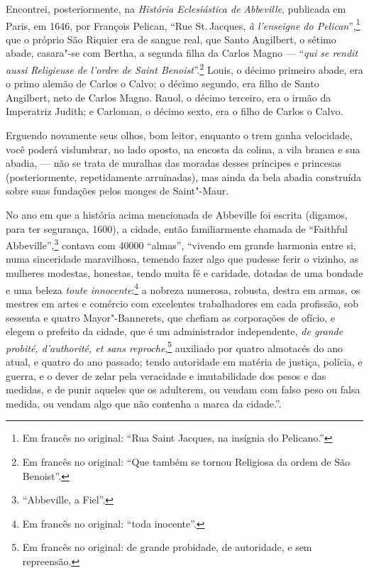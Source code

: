 Encontrei, posteriormente, na \textit{História Eclesiástica de}
\textit{Abbeville}, publicada em Paris, em 1646, por François Pelican,
``Rue St.\,Jacques, \textit{à l'enseigne do Pelican}'',\footnote{Em francês
  no original: ``Rua Saint Jacques, na insígnia do Pelicano.''} que o próprio São Riquier era de sangue real, que Santo
Angilbert, o sétimo abade, casara"-se com Bertha, a segunda filha da
Carlos Magno --- ``\textit{qui se rendit aussi} \textit{Religieuse de l'ordre
de Saint Benoist}''.\footnote{Em francês no original: ``Que também se
  tornou Religiosa da ordem de São Benoist''.} Louis, o
décimo primeiro abade, era o primo alemão de Carlos o Calvo; o décimo
segundo, era filho de Santo Angilbert, neto de Carlos Magno. Rauol, o
décimo terceiro, era o irmão da Imperatriz Judith; e Carloman, o décimo
sexto, era o filho de Carlos o Calvo.

Erguendo novamente seus olhos, bom leitor, enquanto o trem ganha
velocidade, você poderá vislumbrar, no lado oposto, na encosta da
colina, a vila branca e sua abadia, --- não se trata de muralhas das
moradas desses príncipes e princesas (posteriormente, repetidamente
arruinadas), mas ainda da bela abadia construída sobre suas fundações
pelos monges de Saint"-Maur.

No ano em que a história acima mencionada de Abbeville foi escrita
(digamos, para ter segurança, 1600), a cidade, então familiarmente
chamada de ``Faithful Abbeville'',\footnote{``Abbeville, a Fiel''.} contava com 40000 ``almas'', ``vivendo em grande harmonia
entre si, numa sinceridade maravilhosa, temendo fazer algo que pudesse
ferir o vizinho, as mulheres modestas, honestas, tendo muita fé e
caridade, dotadas de uma bondade e uma beleza \textit{toute
innocente}:\footnote{Em francês no original: ``toda inocente''.} a nobreza numerosa, robusta, destra em armas, os mestres em
artes e comércio com excelentes trabalhadores em cada profissão, sob
sessenta e quatro Mayor"-Bannerets, que chefiam as corporações de ofício,
e elegem o prefeito da cidade, que é um administrador independente,
\textit{de grande probité, d'authorité, et sans reproche},\footnote{Em
  francês no original: de grande probidade, de autoridade, e sem
  repreensão.} auxiliado por quatro almotacés do ano
atual, e quatro do ano passado; tendo autoridade em matéria de justiça,
polícia, e guerra, e o dever de zelar pela veracidade e imutabilidade
dos pesos e das medidas, e de punir aqueles que os adulterem, ou vendam
com falso peso ou falsa medida, ou vendam algo que não contenha a marca
da cidade.''.

